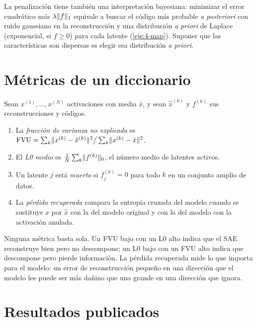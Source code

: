 La penalización tiene también una interpretación bayesiana: minimizar el error cuadrático más $\lambda\lVert f\rVert_1$ equivale a buscar el código más probable \emph{a posteriori} con ruido gaussiano en la reconstrucción y una distribución \emph{a priori} de Laplace (exponencial, si $f\ge 0$) para cada latente (\cref{eje:4-map}). Suponer que las características son dispersas es elegir esa distribución \emph{a priori}.

\section{Métricas de un diccionario}

\begin{definicion}\label{def:metricas}
Sean $x^{(1)},\dots,x^{(N)}$ activaciones con media $\bar x$, y sean $\hat x^{(k)}$ y $f^{(k)}$ sus reconstrucciones y códigos.
\begin{enumerate}
  \item La \emph{fracción de varianza no explicada} es $\operatorname{FVU}=\sum_k\lVert x^{(k)}-\hat x^{(k)}\rVert^{2}\big/\sum_k\lVert x^{(k)}-\bar x\rVert^{2}$.
  \item El \emph{L0 medio} es $\frac1N\sum_k\lVert f^{(k)}\rVert_0$, el número medio de latentes activos.
  \item Un latente $j$ está \emph{muerto} si $f^{(k)}_j=0$ para todo $k$ en un conjunto amplio de datos.
  \item La \emph{pérdida recuperada} compara la entropía cruzada del modelo cuando se sustituye $x$ por $\hat x$ con la del modelo original y con la del modelo con la activación anulada.
\end{enumerate}
\end{definicion}

Ninguna métrica basta sola. Un FVU bajo con un L0 alto indica que el SAE reconstruye bien pero no descompone; un L0 bajo con un FVU alto indica que descompone pero pierde información. La pérdida recuperada mide lo que importa para el modelo: un error de reconstrucción pequeño en una dirección que el modelo lee puede ser más dañino que uno grande en una dirección que ignora.

\addtocounter{definicion}{1}%

\section{Resultados publicados}

